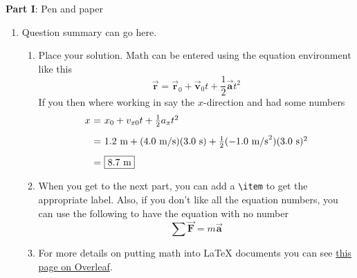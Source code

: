 \documentclass{article}
\begin{document}
\setcounter{page}{0}
\thispagestyle{empty}
\renewcommand{\thesection}{\Roman{section}}

\newpage




\large{\textbf{Part I}: Pen and paper}\normalsize

\begin{enumerate}[leftmargin=\labelsep]
\item Question summary can go here.
    \begin{enumerate}
    \item Place your solution. Math can be entered using the equation
    environment like this
    \begin{equation}
        \vec{\mathbf{r}} = \vec{\mathbf{r}}_{0} + \vec{\mathbf{v}}_{0}t + \frac{1}{2}\vec{\mathbf{a}}t^{2}
    \end{equation}
    If you then where working in say the $x$-direction and had some numbers %
    \begin{equation}
    \begin{array}{r@{~=~}l}
    x & x_{0} + v_{x0}t + \frac{1}{2}a_{x}t^{2} \\ [2ex]
    & 1.2~\text{m} + (4.0~\text{m/s})(3.0~\text{s}) + \frac{1}{2}(-1.0~\text{m/s}^{2})(3.0~\text{s})^{2}\\ [2ex]
    & \boxed{8.7~\text{m}}
    \end{array}
    \end{equation}

    \item When you get to the next part, you can add a \verb"\item" to get the appropriate label. Also,
    if you don't like all the equation numbers, you can use the following to have the equation with
    no number
    \begin{equation*}
    \sum\vec{\mathbf{F}} = m\vec{\mathbf{a}}
    \end{equation*}

    \item For more details on putting math into {\LaTeX} documents you can see 
    \href{https://www.overleaf.com/learn/latex/Mathematical_expressions}{this page on Overleaf}.
    \end{enumerate}


\end{enumerate}
\end{document}
